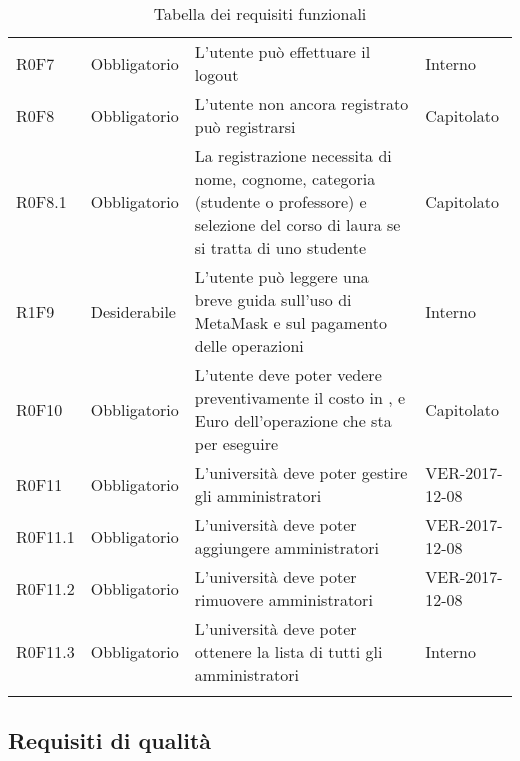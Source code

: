 \documentclass[AnalisiDeiRequisiti.tex]{subfiles}
\begin{document}
\begin{longtable}[H]{p{2.6cm}p{2.5cm}p{5cm}p{2cm}}
	R0F7 & Obbligatorio & L'utente può effettuare il logout & Interno \\  
	R0F8 & Obbligatorio & L'utente non ancora registrato può registrarsi & Capitolato \\  
	R0F8.1 & Obbligatorio & La registrazione necessita di nome, cognome, categoria (studente o professore) e selezione del corso di laura se si tratta di uno studente & Capitolato \\  
	R1F9 & Desiderabile & L'utente può leggere una breve guida sull'uso di MetaMask e sul pagamento delle operazioni & Interno \\  	
	R0F10 & Obbligatorio & L'utente deve poter vedere preventivamente il costo in \citGloss{Gas}, \citGloss{Ether} e Euro dell'operazione che sta per eseguire & Capitolato \\  	
	R0F11 & Obbligatorio & L'università deve poter gestire gli amministratori & VER-2017-12-08 \\
	R0F11.1 & Obbligatorio & L'università deve poter aggiungere amministratori & VER-2017-12-08 \\
	R0F11.2 & Obbligatorio & L'università deve poter rimuovere amministratori & VER-2017-12-08 \\
	R0F11.3 & Obbligatorio & L'università deve poter ottenere la lista di tutti gli amministratori & Interno \\
	\hiderowcolors
	\caption{Tabella dei requisiti funzionali}
\end{longtable}

\subsection{Requisiti di qualità}
\end{document}
